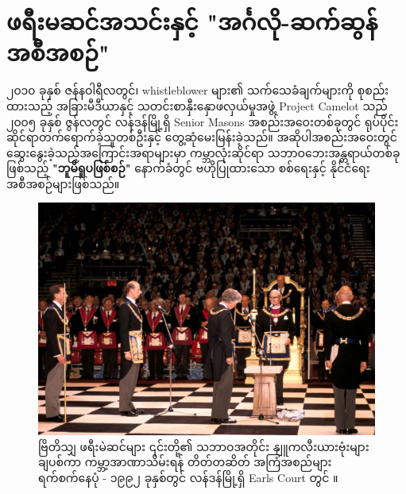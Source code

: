 \documentclass[10pt,twocolumn,letterpaper]{article}
\begin{document}
\section{ဖရီးမဆင်အသင်းနှင့် "အင်္ဂလို-ဆက်ဆွန် အစီအစဉ်"}

၂၀၁၀ ခုနှစ် ဇန်နဝါရီလတွင်၊ whistleblower များ၏ သက်သေခံချက်များကို စုစည်းထားသည့် အခြားမီဒီယာနှင့် သတင်းစာနှီးနှောဖလှယ်မှုအဖွဲ့ Project Camelot သည် \cite{4,6} ၂၀၀၅ ခုနှစ် ဇွန်လတွင် လန်ဒန်မြို့ရှိ Senior Masons အစည်းအဝေးတစ်ခုတွင် ရုပ်ပိုင်းဆိုင်ရာတက်ရောက်ခဲ့သူတစ်ဦးနှင့် တွေ့ဆုံမေးမြန်းခဲ့သည်။ အဆိုပါအစည်းအဝေးတွင် ဆွေးနွေးခဲ့သည့်အကြောင်းအရာများမှာ ကမ္ဘာလုံးဆိုင်ရာ သဘာဝဘေးအန္တရာယ်တစ်ခုဖြစ်သည့် \textbf{"ဘူမိရူပဖြစ်စဉ်"} နောက်ခံတွင် ဗဟိုပြုထားသော စစ်ရေးနှင့် နိုင်ငံရေးအစီအစဉ်များဖြစ်သည်။

\begin{figure}[b]
\begin{center}
\includegraphics[width=1\linewidth]{freemason.jpg}
\end{center}
   \caption{ဗြိတိသျှ ဖရီးမဲဆင်များ ၎င်းတို့၏ သဘာဝအတိုင်း နျူကလီးယားဗုံးများ ချပစ်ကာ ကမ္ဘာ့အာဏာသိမ်းရန် တိတ်တဆိတ် အကြံအစည်များ ရက်စက်နေပုံ - ၁၉၉၂ ခုနှစ်တွင် လန်ဒန်မြို့ရှိ Earls Court တွင် \cite{5}။}
\label{fig:1}
\label{fig:onecol}
\end{figure}
\end{document}
